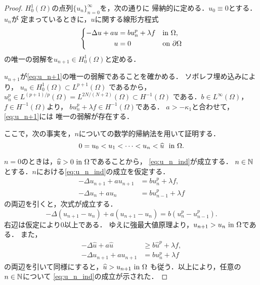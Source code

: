 \begin{proof}
 $H_0^1(\Omega)$の点列$\{ u_n \}_{n=0}^\infty$を，次の通りに
 帰納的に定める．$u_0 \equiv 0$とする．$u_n$が
 定まっているときに，$u$に関する線形方程式
  \begin{align}
   \left\{
   \begin{aligned}
    -\Delta u + a u 
    &= b u_n^p + \lambda f  & &\text{in}~ \Omega,  \\
    u &= 0 & &\text{on}~ \partial\Omega
   \end{aligned}
   \right. \label{eq:u_n+1}
  \end{align}
 の唯一の弱解を$u_{n+1} \in H_0^1(\Omega)$と定める．
 
 $u_{n+1}$が\eqref{eq:u_n+1}の唯一の弱解であることを確かめる．
 ソボレフ埋め込みにより，
 $
  u_n \in H_0^1(\Omega) \subset L^{p+1}(\Omega)
 $
 であるから，
 $
  u_n^p \in L^{(p+1)/p}(\Omega)
 = L^{2N/(N+2)}(\Omega) \subset H^{-1}(\Omega)
 $
 である．$b \in L^\infty(\Omega)$，$f \in H^{-1}(\Omega)$より，
 $b u_n^p + \lambda f \in H^{-1}(\Omega)$である．
 $a > -\kappa_1$と合わせて，\eqref{eq:u_n+1}には
 唯一の弱解が存在する．

 ここで，次の事実を，$n$についての数学的帰納法を用いて証明する．
 \begin{equation}
  0 = u_0 < u_1 < \dots < u_n < \widehat{u} \ \ \text{in}~ \Omega. \label{eq:u_n_ind}
 \end{equation}

 $n = 0$のときは，$\widehat{u} > 0 ~\text{in}~ \Omega$であることから，
 \eqref{eq:u_n_ind}が成立する．
 $n \in \mathbb{N}$とする．$n$における\eqref{eq:u_n_ind}の成立を仮定する．
 \begin{align*}
  -\Delta u_{n+1} + a u_{n+1} &= b u_n^p + \lambda f, \\
  -\Delta u_{n} + a u_{n} &= b u_{n-1}^p + \lambda f
 \end{align*}
 の両辺を引くと，次式が成立する．
 \[
  -\Delta (u_{n+1} - u_n) + a(u_{n+1} - u_n) 
 = b(u_n^p - u_{n-1}^p).
 \]
 右辺は仮定により$0$以上である．
 ゆえに強最大値原理より，$u_{n+1} > u_n ~\text{in}~\Omega$である．
 また，
 \begin{align*}
  -\Delta \hat{u} + a \hat{u} &\geq b \hat{u}^p + \lambda f, \\
  -\Delta u_{n+1} + a u_{n+1} &= b u_{n}^p + \lambda f
 \end{align*}
 の両辺を引いて同様にすると，$\widehat{u} > u_{n+1} ~\text{in}~ \Omega$
 も従う．以上により，任意の$n \in \mathbb{N}$について
 \eqref{eq:u_n_ind}の成立が示された．


\end{proof}
